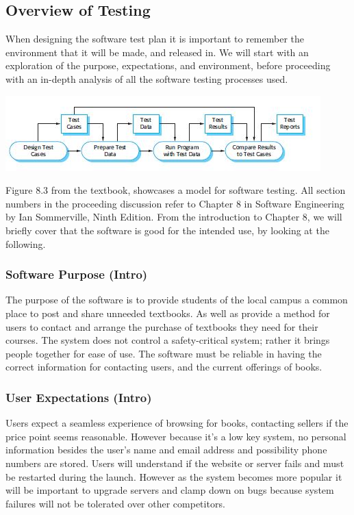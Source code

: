 \documentclass[11pt]{article}
\begin{document}
	\subsection{Overview of Testing}
		When designing the software test plan it is important to remember the environment that it will be made, and released in.
		We will start with an exploration of the purpose, expectations, and environment, before proceeding with an in-depth analysis of all the software testing processes used. \\
		\centerline{\includegraphics[scale=0.75]{./images/testProcesses}} 
		Figure 8.3 from the textbook, showcases a model for software testing.
		All section numbers in the proceeding discussion refer to Chapter 8 in Software Engineering by Ian Sommerville, Ninth Edition.
		From the introduction to Chapter 8, we will briefly cover that the software is good for the intended use, by looking at the following.
		\subsubsection{Software Purpose (Intro)}
			The purpose of the software is to provide students of the local campus a common place to post and share unneeded textbooks.
			As well as provide a method for users to contact and arrange the purchase of textbooks they need for their courses. 
			The system does not control a safety-critical system; rather it brings people together for ease of use. 
			The software must be reliable in having the correct information for contacting users, and the current offerings of books.
		\subsubsection{User Expectations (Intro)}
			Users expect a seamless experience of browsing for books, contacting sellers if the price point seems reasonable.
			However because it's a low key system, no personal information besides the user's name and email address and possibility phone numbers are stored.
			Users will understand if the website or server fails and must be restarted during the launch.
			However as the system becomes more popular it will be important to upgrade servers and clamp down on bugs because system failures will not be tolerated over other competitors.
\end{document}
